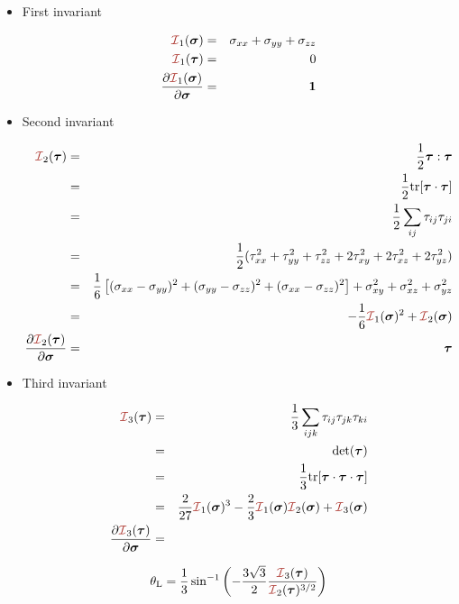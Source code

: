 \begin{itemize}
\item First invariant %

\begin{eqnarray}
{\III}_1(\bm\sigma) &=& \sigma_{xx}+\sigma_{yy}+\sigma_{zz} \nn\\
{\III}_1(\bm\tau) &=& 0 \nn\\ 
\frac{\partial {\III}_1(\bm\sigma)}{\partial \bm\sigma} &=& {\bm 1}  \nn
\end{eqnarray}

\item Second invariant %

\begin{eqnarray}
{\III}_2(\bm\tau) 
&=& \frac12 {\bm \tau}:{\bm \tau} \nn\\
&=& \frac12 {\rm tr} [{\bm \tau}\cdot {\bm \tau}] \nn\\
&=& \frac12 \sum_{ij} \tau_{ij}\tau_{ji}  \nn\\
&=& \frac12 ( \tau_{xx}^2 + \tau_{yy}^2 +\tau_{zz}^2 + 2\tau_{xy}^2+ 2\tau_{xz}^2+ 2\tau_{yz}^2) \nn\\
&=& \frac{1}{6}\left[(\sigma_{xx}-\sigma_{yy})^2 + (\sigma_{yy}-\sigma_{zz})^2 
+ (\sigma_{xx}-\sigma_{zz})^2 \right]  + \sigma_{xy}^2 + \sigma_{xz}^2 + \sigma_{yz}^2 \nn\\
&=&  -\frac16 {\III}_1(\bm\sigma)^2 + {\III}_2(\bm\sigma) \nn\\
\frac{\partial {\III}_2(\bm\tau)}{\partial \bm\sigma} &=& \bm\tau   \nn
\end{eqnarray}

\item Third invariant %

\begin{eqnarray}
{\III}_3(\bm\tau) 
&=& \frac13 \sum_{ijk} \tau_{ij}\tau_{jk}\tau_{ki} \nn\\
&=& {\rm det}(\bm\tau) \nn\\
&=& \frac13 {\rm tr} [{\bm \tau}\cdot {\bm \tau} \cdot {\bm \tau}] \nn\\
&=& \frac{2}{27}  {\III}_1(\bm\sigma)^3 - \frac23{\III}_1(\bm\sigma) {\III}_2(\bm\sigma)
+{\III}_3(\bm\sigma) \nn\\
\frac{\partial {\III}_3(\bm\tau)}{\partial \bm\sigma} &=&
\end{eqnarray}

\begin{equation}
\theta_{\rm L}=\frac{1}{3} \sin^{-1} 
\left( -\frac{3\sqrt{3}}{2} \frac{{\III}_3({\bm \tau})}{{\III}_2({\bm \tau})^{3/2}} \right)
\end{equation}


\end{itemize}


